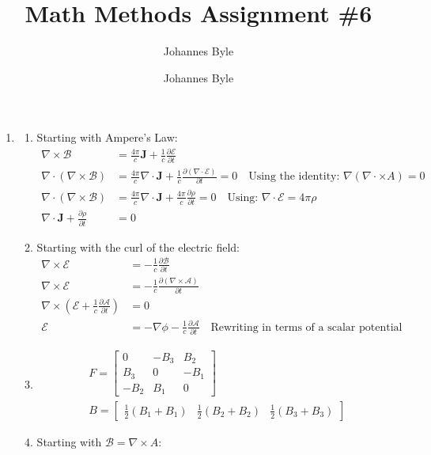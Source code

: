 \documentclass[12pt]{article}
\title{}
\author{Johannes Byle}
\title{Math Methods Assignment \#6}
\author{Johannes Byle}
\newcommand{\p}[2]{\frac{\partial #1}{\partial #2}}
\newcommand{\curl}{\nabla\times}
\newcommand{\divr}{\nabla\cdot}
\begin{document}
  \maketitle
  \begin{enumerate}
    \item
    \begin{enumerate}
      \item Starting with Ampere's Law:
      \begin{align*}
        \curl\mathcal{B}&=\frac{4\pi}{c}\pmb{J}+\frac{1}{c}\p{\mathcal{E}}{t}\\
        \divr\left(\nabla\times\mathcal{B}\right)&=\frac{4\pi}{c}\divr\pmb{J}+\frac{1}{c}\p{(\nabla\cdot\mathcal{E})}{t}=0\quad\text{Using the identity: }\nabla\left( \nabla\cdot\times A \right)=0\\
        \divr\left(\nabla\times\mathcal{B}\right)&=\frac{4\pi}{c}\divr\pmb{J}+\frac{4\pi}{c}\p{\rho}{t}=0\quad\text{Using: }\nabla\cdot\mathcal{E}=4\pi\rho\\
        \divr\pmb{J}+\p{\rho}{t}&=0
      \end{align*}
      \item Starting with the curl of the electric field:
      \begin{align*}
        \curl\mathcal{E}&=-\frac{1}{c}\p{\mathcal{B}}{t}\\
        \curl\mathcal{E}&=-\frac{1}{c}\p{(\curl\mathcal{A})}{t}\\
        \curl\left(\mathcal{E}+\frac{1}{c}\p{\mathcal{A}}{t}\right)&=0\\
        \mathcal{E}&=-\nabla\phi-\frac{1}{c}\p{\mathcal{A}}{t}\quad\text{Rewriting in terms of a scalar potential}
      \end{align*}
      \item
      \begin{gather*}
        F=
        \begin{bmatrix}
          0    & -B_3 & B_2  \\
          B_3  & 0    & -B_1 \\
          -B_2 & B_1  & 0
        \end{bmatrix}\\
        B=
        \begin{bmatrix}
          \frac{1}{2}(B_1+B_1) & \frac{1}{2}(B_2+B_2)& \frac{1}{2}(B_3+B_3)
        \end{bmatrix}
      \end{gather*}
      \item Starting with $\mathcal{B}=\curl A$:

\end{enumerate}
\end{enumerate}
\end{document}
